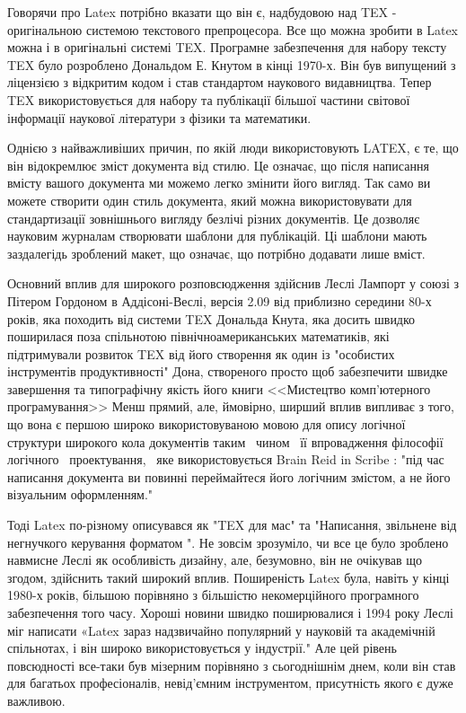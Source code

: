 

Говорячи про Latex потрібно вказати що він є, надбудовою над TEX - оригінальною системою текстового препроцесора. Все що можна зробити в Latex можна і в оригінальні системі TEX. Програмне забезпечення для набору тексту TEX було розроблено Дональдом Е. Кнутом в кінці 1970-х. Він був випущений з ліцензією з відкритим кодом і став стандартом наукового видавництва. Тепер TEX використовується для набору та публікації більшої частини світової інформації наукової літератури з фізики та математики.

Однією з найважливіших причин, по якій люди використовують LATEX, є те, що він відокремлює зміст документа від стилю. Це означає, що після написання вмісту вашого документа ми можемо легко змінити його вигляд. Так само ви можете створити один стиль документа, який можна використовувати для стандартизації зовнішнього вигляду безлічі різних документів. Це дозволяє науковим журналам створювати шаблони для публікацій. Ці шаблони мають заздалегідь зроблений макет, що означає, що потрібно додавати лише вміст.

Основний вплив для широкого розповсюдження здійснив
Леслі Лампорт у союзі з Пітером Гордоном в Аддісоні-Веслі,
версія 2.09 від приблизно середини 80-х років, яка походить від  системи TEX Дональда Кнута, яка досить швидко поширилася поза спільнотою північноамериканських математиків, які підтримували  розвиток TEX від його створення як один із "особистих інструментів продуктивності" Дона, створеного просто щоб забезпечити швидке завершення та типографічну якість його книги <<Мистецтво комп'ютерного програмування>> \cite{Knuth} Менш прямий, але, ймовірно, ширший вплив випливає з того, що вона є першою широко використовуваною мовою для опису логічної структури широкого кола документів таким \ чином \ її впровадження філософії логічного \ проектування, \ яке \newpage \noindent використовується Brain Reid in Scribe \cite{Reid}: "під час написання документа ви повинні
переймайтеся його логічним змістом, а не його візуальним оформленням."

Тоді Latex по-різному описувався як "TEX для мас" та "Написання, звільнене від негнучкого керування форматом ". Не зовсім
зрозуміло, чи все це було зроблено навмисне Леслі як особливість дизайну, але, безумовно, він не очікував що згодом, здійснить такий широкий вплив. Поширеність Latex була, навіть у кінці 1980-х років, більшою порівняно з більшістю некомерційного програмного забезпечення того часу. Хороші новини швидко поширювалися і 1994 року Леслі міг написати «Latex зараз надзвичайно популярний у науковій та академічній спільнотах, і він широко використовується у індустрії." Але цей рівень повсюдності все-таки був мізерним порівняно з сьогоднішнім днем, коли він став для багатьох професіоналів, невід'ємним інструментом, присутність якого є дуже важливою.

